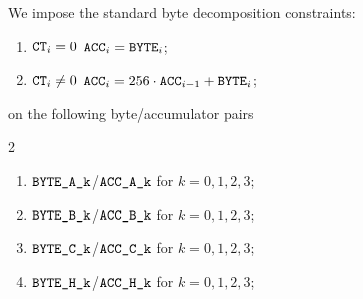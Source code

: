 We impose the standard byte decomposition constraints:
\begin{enumerate}
	\item \If $\texttt{CT}_{i} = 0$ \Then $\texttt{ACC}_{i} = \texttt{BYTE}_{i}$;
	\item \If $\texttt{CT}_{i} \neq 0$ \Then $\texttt{ACC}_{i} = 256 \cdot \texttt{ACC}_{i - 1} + \texttt{BYTE}_{i}$;
\end{enumerate}
on the following byte/accumulator pairs
\begin{multicols}{2}
\begin{enumerate}
	\item $\texttt{BYTE}\texttt{\_A\_k}$/$\texttt{ACC}\texttt{\_A\_k}$ for $k=0,1,2,3$;
	\item $\texttt{BYTE}\texttt{\_B\_k}$/$\texttt{ACC}\texttt{\_B\_k}$ for $k=0,1,2,3$;
	\item $\texttt{BYTE}\texttt{\_C\_k}$/$\texttt{ACC}\texttt{\_C\_k}$ for $k=0,1,2,3$;
	\item $\texttt{BYTE}\texttt{\_H\_k}$/$\texttt{ACC}\texttt{\_H\_k}$ for $k=0,1,2,3$;
\end{enumerate}
\end{multicols}
